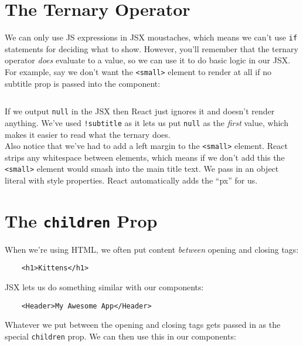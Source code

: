 \section{The Ternary Operator}

We can only use JS expressions in JSX moustaches, which means we can't use \texttt{if} statements for deciding what to show. However, you'll remember that the ternary operator \textit{does} evaluate to a value, so we can use it to do basic logic in our JSX.
\\

For example, say we don't want the \texttt{<small>} element to render at all if no subtitle prop is passed into the component:

\inputminted{jsx}{01/figures/03/07-Header-ternary.jsx}

If we output \texttt{null} in the JSX then React just ignores it and doesn't render anything. We've used \texttt{!subtitle} as it lets us put \texttt{null} as the \textit{first} value, which makes it easier to read what the ternary does.
\\

Also notice that we've had to add a left margin to the \texttt{<small>} element. React strips any whitespace between elements, which means if we don't add this the \texttt{<small>} element would smash into the main title text. We pass in an object literal with style properties. React automatically adds the ``px'' for us.




\section{The \texttt{children} Prop}

When we're using HTML, we often put content \textit{between} opening and closing tags:

\begin{verbatim}
    <h1>Kittens</h1>
\end{verbatim}

JSX lets us do something similar with our components:

\begin{verbatim}
    <Header>My Awesome App</Header>
\end{verbatim}

Whatever we put between the opening and closing tags gets passed in as the special \texttt{children} prop. We can then use this in our components:

\inputminted{jsx}{01/figures/03/08-Header-children.jsx}

